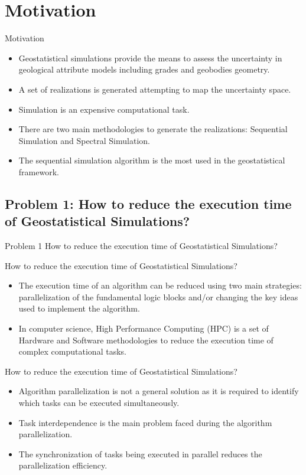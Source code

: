 \section{Motivation}

\begin{frame}{Motivation}
  \begin{itemize}
    \item Geostatistical simulations provide the means to assess the uncertainty in geological attribute models including grades and geobodies geometry.
    \item A set of realizations is generated attempting to map the uncertainty space.
    \item Simulation is an expensive computational task.
    \item There are two main methodologies to generate the realizations: Sequential Simulation and Spectral Simulation.
     \item The sequential simulation algorithm is the most used in the geostatistical framework.
  \end{itemize}
\vskip 1cm
\end{frame}

\subsection{Problem 1: How to reduce the execution time of Geostatistical Simulations?}
\begin{frame}{Problem 1}	
How to reduce the execution time of Geostatistical Simulations? 
\end{frame}

\begin{frame}{How to reduce the execution time of Geostatistical Simulations?}
	\begin{itemize}
      \item The execution time of an algorithm can be reduced using two main strategies: parallelization of the fundamental logic blocks and/or changing the key ideas used to implement the algorithm.
		\item In computer science, High Performance Computing (HPC) is a set of  Hardware and Software methodologies to reduce the execution time of complex computational tasks.    
    \end{itemize}
\end{frame}

\begin{frame}{How to reduce the execution time of Geostatistical Simulations?}
	\begin{itemize}
    	\item Algorithm parallelization is not a general solution as it is required  to identify which tasks can be executed simultaneously.
        \item Task interdependence is the main problem faced during the algorithm parallelization.
        \item  The synchronization of tasks being executed in parallel reduces the parallelization efficiency.
    \end{itemize}
\end{frame}

